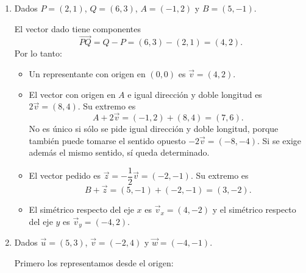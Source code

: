 \begin{enumerate}[\hspace{-3mm}$1)$]

\item Dados $P=(2,1)$, $Q=(6,3)$, $A=(-1,2)$ y $B=(5,-1)$.

\begin{sol}
El vector dado tiene componentes
\[
\overrightarrow{PQ}=Q-P=(6,3)-(2,1)=(4,2).
\]
Por lo tanto:
\begin{itemize}
\item[a)] Un representante con origen en $(0,0)$ es $\vec v=(4,2)$.
\item[b)] El vector con origen en $A$ e igual dirección y doble longitud es $2\vec v=(8,4)$. Su extremo es
\[
A+2\vec v=(-1,2)+(8,4)=(7,6).
\]
No es único si sólo se pide igual dirección y doble longitud, porque también puede tomarse el sentido opuesto $-2\vec v=(-8,-4)$. Si se exige además el mismo sentido, sí queda determinado.
\item[c)] El vector pedido es $\vec z=-\dfrac12\vec v=(-2,-1)$. Su extremo es
\[
B+\vec z=(5,-1)+(-2,-1)=(3,-2).
\]
\item[d)] El simétrico respecto del eje $x$ es $\vec v_x=(4,-2)$ y el simétrico respecto del eje $y$ es $\vec v_y=(-4,2)$.
\end{itemize}

\begin{center}
\end{center}
\end{sol}

\item Dados $\vec u=(5,3)$, $\vec v=(-2,4)$ y $\vec w=(-4,-1)$.

\begin{sol}
Primero los representamos desde el origen:
\begin{center}
\end{center}


\end{sol}
\end{enumerate}
